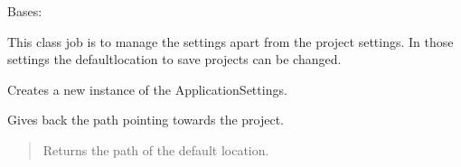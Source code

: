 \documentclass[letterpaper,10pt,english]{sphinxmanual}
\begin{document}
\begin{fulllineitems}
\label{\detokenize{apidoc/src.osm_configurator.model.application:src.osm_configurator.model.application.application_settings.ApplicationSettings}}
\pysigstartsignatures
{}
\pysigstopsignatures
\sphinxAtStartPar
Bases: 

\sphinxAtStartPar
This class job is to manage the settings apart from the project settings. In those settings the default\sphinxhyphen{}location
to save projects can be changed.

\begin{fulllineitems}
\label{\detokenize{apidoc/src.osm_configurator.model.application:src.osm_configurator.model.application.application_settings.ApplicationSettings.__init__}}
\pysigstartsignatures
{}
\pysigstopsignatures
\sphinxAtStartPar
Creates a new instance of the ApplicationSettings.

\end{fulllineitems}


\begin{fulllineitems}
\label{\detokenize{apidoc/src.osm_configurator.model.application:src.osm_configurator.model.application.application_settings.ApplicationSettings.get_default_location}}
\pysigstartsignatures
{}
\pysigstopsignatures
\sphinxAtStartPar
Gives back the path pointing towards the project.
\begin{quote}\begin{description}
\sphinxAtStartPar
Returns the path of the default location.

\sphinxAtStartPar
{}

\end{description}\end{quote}


\end{fulllineitems}
\end{fulllineitems}
\end{document}

